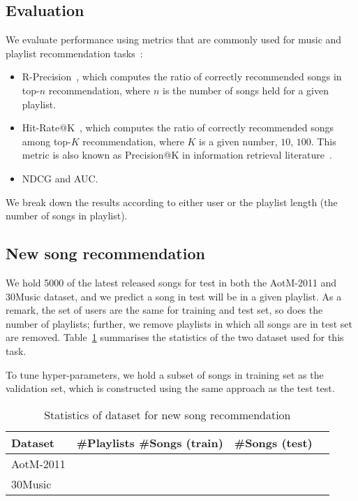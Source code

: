 \subsection{Evaluation}
We evaluate performance using metrics that are commonly used for music and playlist recommendation 
tasks~\cite{schedl2017,hariri2012context,jannach2015beyond}:
\begin{itemize}
\item R-Precision~\cite{manning2008introIR}, which computes the ratio of correctly recommended songs in top-$n$ recommendation, 
      where $n$ is the number of songs held for a given playlist.
\item Hit-Rate@K~\cite{hariri2012context}, which computes the ratio of correctly recommended songs among top-$K$ recommendation, 
      where $K$ is a given number, \eg $10$, $100$. 
      This metric is also known as Precision@K in information retrieval literature~\cite{manning2008introIR}.
\item NDCG and AUC.
\end{itemize}
We break down the results according to either user or the playlist length (\ie the number of songs in playlist).


\subsection{New song recommendation}
\label{ssec:newsongrec}

We hold 5000 of the latest released songs for test in both the AotM-2011 and 30Music dataset,
and we predict a song in test will be in a given playlist.
As a remark, the set of users are the same for training and test set,
so does the number of playlists; 
further, we remove playlists in which all songs are in test set are removed.
Table~\ref{tab:stats_newsongrec} summarises the statistics of the two dataset used for this task.

To tune hyper-parameters, we hold a subset of songs in training set as the validation set, 
which is constructed using the same approach as the test test.

\begin{table}[!h]
\centering
\caption{Statistics of dataset for new song recommendation}
\label{tab:stats_newsongrec}
\small
\begin{tabular}{l|rrr}
\toprule
Dataset   & \#Playlists \#Songs (train) & \#Songs (test) \\
\midrule
AotM-2011 &           &          & \\
30Music   &           &          & \\
\bottomrule
\end{tabular}
\end{table}

